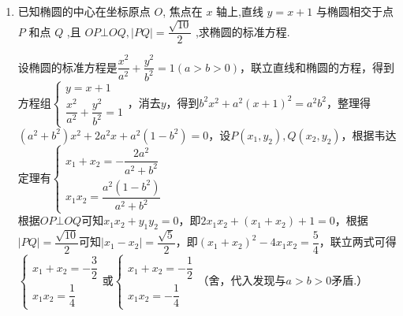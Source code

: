 \begin{enumerate}
\begin{enumerate}
\begin{jieda}
            $\bigtriangleup {AB}{F}_{2}$ 内切圆的半径为 $r$，内切圆的周长是 ${2\pi }$，则 $r = 1$
            
            设 $A\left( {{x}_{1},{y}_{1}}\right) ,B\left( {{x}_{2},{y}_{2}}\right)$ ，由题意得 $\dfrac{1}{2} \times  {4a} \times  r = \dfrac{1}{2} \times  {2c} \times  \left| {{y}_{1} - {y}_{2}}\right|$ ，即 $\left| {{y}_{1} - {y}_{2}}\right|  = \dfrac{2a}{c} = \dfrac{2}{e} = 4$ 
            
            所以 $\left| {AB}\right|  = \sqrt{1 + \dfrac{1}{{k}^{2}}}\left| {{y}_{1} - {y}_{2}}\right|  = 4\sqrt{5}$ .
        \end{jieda}
        \item 已知椭圆的中心在坐标原点 $O$, 焦点在 $x$ 轴上,直线 $y = x + 1$ 与椭圆相交于点 $P$ 和点 $Q$ ,且 ${OP} \bot  {OQ},\left| {PQ}\right|  = \dfrac{\sqrt{10}}{2}$ ,求椭圆的标准方程.
        \begin{jieda}
            设椭圆的标准方程是$\dfrac{x^2}{a^2}+\dfrac{y^2}{b^2} = 1(a > b > 0)$，联立直线和椭圆的方程，得到方程组$\left\{\begin{array}{l}
                 y = x + 1 \\
                 \dfrac{x^2}{a^2}+\dfrac{y^2}{b^2} = 1
            \end{array}\right.$，消去$y$，得到$b^2x^2+a^2(x+1)^2 = a^2b^2$，整理得$(a^2+b^2)x^2+2a^2x+a^2(1-b^2) = 0$，设$P(x_1, y_2), Q(x_2, y_2)$，根据韦达定理有$\left\{\begin{array}{l}
                 x_1+x_2 = -\dfrac{2a^2}{a^2+b^2} \\
                 x_1x_2 = \dfrac{a^2(1-b^2)}{a^2+b^2}
            \end{array}\right.$\\
            根据${OP} \bot  {OQ}$可知$x_1x_2+y_1y_2 = 0$，即$2x_1x_2+(x_1+x_2)+1 = 0$，根据$\left| {PQ}\right|  = \dfrac{\sqrt{10}}{2}$可知$|x_1-x_2| = \dfrac{\sqrt{5}}{2}$，即$(x_1+x_2)^2-4x_1x_2 = \dfrac{5}{4}$，联立两式可得$\left\{\begin{array}{l}
                 x_1+x_2 = -\dfrac{3}{2} \\
                 x_1x_2 = \dfrac{1}{4}
            \end{array}\right.$或$\left\{\begin{array}{l}
                 x_1+x_2 = -\dfrac{1}{2} \\
                 x_1x_2 = -\dfrac{1}{4}
            \end{array}\right.$（舍，代入发现与$a>b>0$矛盾.）
            

\end{jieda}
\end{enumerate}
\end{enumerate}
